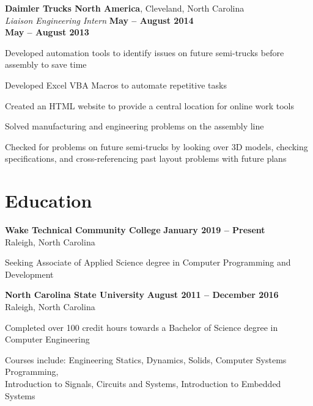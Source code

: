 \documentclass[margin,line]{resume}
\begin{document}
\begin{resume}
    \textbf{Daimler Trucks North America}, Cleveland, North Carolina \\
    \textsl{Liaison Engineering Intern} \hfill \textbf{May -- August 2014}\\
    \vspace{1mm}
    \hfill \textbf{May -- August 2013}\\
    \vspace{-4mm}
    \begin{list2}
    \item Developed automation tools to identify issues on future semi-trucks before assembly to save time
    \item Developed Excel VBA Macros to automate repetitive tasks
    \item Created an HTML website to provide a central location for online work tools
    \item Solved manufacturing and engineering problems on the assembly line
    \item Checked for problems on future semi-trucks by looking over 3D models, checking specifications, and cross-referencing past layout problems with future plans
    \end{list2}
    \vspace{2mm}

    \section{\mysidestyle Education}


\textbf{Wake Technical Community College} \hfill \textbf{January 2019 -- Present}\\
    Raleigh, North Carolina\\
    \vspace{-4mm}
    \begin{list2}
    	\item Seeking Associate of Applied Science degree in Computer Programming and Development
    \end{list2}


    \textbf{North Carolina State University} \hfill \textbf{August 2011 -- December 2016}\\
    Raleigh, North Carolina\\
    \vspace{-4mm}
    \begin{list2}
    	\item Completed over 100 credit hours towards a Bachelor of Science degree in Computer Engineering
        \item Courses include: Engineering Statics, Dynamics, Solids, Computer Systems Programming,\\
        Introduction to Signals, Circuits and Systems, Introduction to Embedded Systems
    \end{list2}



\end{resume}
\end{document}
